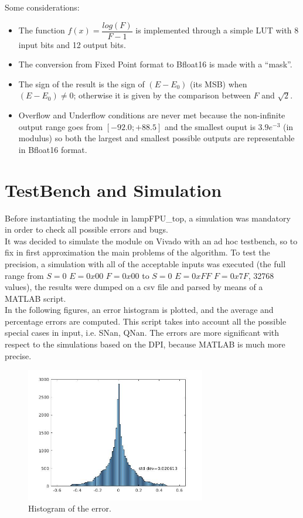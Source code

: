 \documentclass{report}
\begin{document}
\newline
Some considerations:
\begin{itemize}
\item The function $f(x)=\dfrac{log(F)}{F-1}$ is implemented through a simple LUT with 8 input bits and 12 output bits.
\item The conversion from Fixed Point format to Bfloat16 is made with a “mask”.
\item The sign of the result is the sign of $(E-E_{0})$ (its MSB) when $(E-E_{0})\neq0$; otherwise it is given by the comparison between $F$ and $\sqrt{2}$.
\item Overflow and Underflow conditions are never met because the non-infinite output range goes from $[-92.0; +88.5]$ and the smallest ouput is $3.9e^{-3}$ (in modulus) so both the largest and smallest possible outputs are representable in Bfloat16 format.
\end{itemize}
    

\chapter{TestBench and Simulation}
Before instantiating the module in lampFPU\_top, a simulation was mandatory in order to check all possible errors and bugs.
\\It was decided to simulate the module on Vivado with an ad hoc testbench, so to fix in first approximation the main problems of the algorithm. To test the precision, a simulation with all of the acceptable inputs was executed (the full range from $S=0$  $E=0x00$  $F=0x00$ to $S=0$  $E=0xFF$  $F=0x7F$, 32768 values), the results were dumped on a csv file and parsed by means of a MATLAB script.
\\In the following figures, an error histogram is plotted, and the average and percentage errors are computed.
This script takes into account all the possible special cases in input, i.e. SNan, QNan.
The errors are more significant with respect to the simulations based on the DPI, because MATLAB is much more precise.
\begin{figure}[ht]
  \centering
    \includegraphics[width=0.7\textwidth]{images/hist.jpg}
    \caption{Histogram of the error.}
\end{figure}
    
\end{document}
